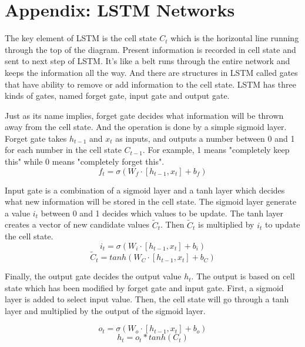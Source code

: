 \section{Appendix: LSTM Networks}

The key element of LSTM is the cell state $C_t$ which is the horizontal line running through the top of the diagram. Present information is recorded in cell state and sent to next step of LSTM. It's like a belt runs through the entire network and keeps the information all the way. And there are structures in LSTM called gates that have ability to remove or add information to the cell state. LSTM has three kinds of gates, named forget gate, input gate and output gate.

Just as its name implies, forget gate decides what information will be thrown away from the cell state. And the operation is done by a simple sigmoid layer. Forget gate takes $h_{t-1}$ and $x_t$ as inputs, and outputs a number between 0 and 1 for each number in the cell state $C_{t-1}$. For example, 1 means "completely keep this" while 0 means "completely forget this".
$$f_t = \sigma (W_f \cdot [h_{t-1}, x_t] + b_f)$$

Input gate is a combination of a sigmoid layer and a tanh layer which decides what new information will be stored in the cell state. The sigmoid layer generate a value $i_t$ between 0 and 1 decides which values to be update. The tanh layer creates a vector of new candidate values $\widetilde{C}_t$. Then $\widetilde{C}_t$ is multiplied by $i_t$ to update the cell state.
$$i_t = \sigma (W_i \cdot [h_{t-1}, x_t] + b_i)$$
$$\widetilde{C}_t = tanh(W_C \cdot [h_{t-1}, x_t] + b_C)$$

Finally, the output gate decides the output value $h_t$. The output is based on cell state which has been modified by forget gate and input gate. First, a sigmoid layer is added to select input value. Then, the cell state will go through a tanh layer and multiplied by the output of the sigmoid layer.

$$o_t = \sigma (W_o \cdot [h_{t-1}, x_t] + b_o)$$
$$h_t = o_t * tanh(C_t)$$

